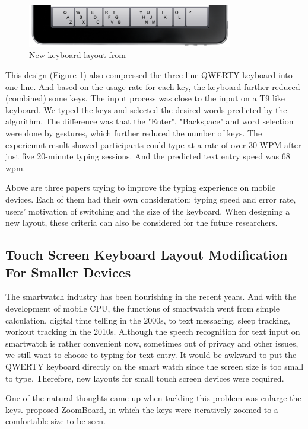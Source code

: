 \documentclass[11pt]{article}
\begin{document}
\begin{figure}[H]
  \centering
  \includegraphics[width=0.8\textwidth]{Layout2011.png}
  \caption{New keyboard layout from \citep{10.1145/2047196.2047257}}
  \label{fig:layout2011}
\end{figure}

This design (Figure \ref{fig:layout2011}) also compressed the three-line QWERTY keyboard into one line. And based on the usage rate for each key, the keyboard further reduced (combined) some keys. The input process was close to the input on a T9 like keyboard. We typed the keys and selected the desired words predicted by the algorithm. The difference was that the "Enter", "Backspace" and word selection were done by gestures, which further reduced the number of keys. The experiemnt result showed participants could type at a rate of over 30 WPM after just five 20-minute typing sessions. And the predicted text entry speed was 68 wpm.

Above are three papers trying to improve the typing experience on mobile devices. Each of them had their own consideration: typing speed and error rate, users' motivation of switching and the size of the keyboard. When designing a new layout, these criteria can also be considered for the future researchers.

\subsection{Touch Screen Keyboard Layout Modification For Smaller Devices}

The smartwatch industry has been flourishing in the recent years. And with the development of mobile CPU, the functions of smartwatch went from simple calculation, digital time telling in the 2000s, to text messaging, sleep tracking, workout tracking in the 2010s. Although the speech recognition for text input on smartwatch is rather convenient now, sometimes out of privacy and other issues, we still want to choose to typing for text entry. It would be awkward to put the QWERTY keyboard directly on the smart watch since the screen size is too small to type. Therefore, new layouts for small touch screen devices were required.

One of the natural thoughts came up when tackling this problem was enlarge the keys. \citet{10.1145/2470654.2481387} proposed ZoomBoard, in which the keys were iteratively zoomed to a comfortable size to be seen.
\end{document}
